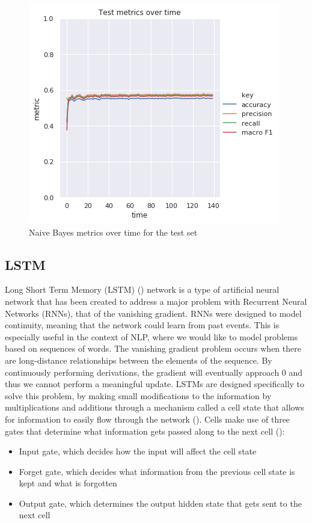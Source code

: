 \documentclass[12pt]{extreport}
\begin{document}
\begin{figure}[ht!]
\centering
\includegraphics[width=0.7\linewidth]{assets/framework/nb_BERT_test_metrics_holdout.png}
\caption{Naive Bayes metrics over time for the test set}
\label{fig:nb-metrics}
\end{figure}

\subsection{LSTM} \label{sec:lstm}

Long Short Term Memory (LSTM) (\cite{lstm}) network is a type of artificial neural network that has been created to address a major problem with Recurrent Neural Networks (RNNs), that of the vanishing gradient. RNNs were designed to model continuity, meaning that the network could learn from past events. This is especially useful in the context of NLP, where we would like to model problems based on sequences of words. The vanishing gradient problem occurs when there are long-distance relationships between the elements of the sequence. By continuously performing derivations, the gradient will eventually approach 0 and thus we cannot perform a meaningful update. LSTMs are designed specifically to solve this problem, by making small modifications to the information by multiplications and additions through a mechanism called a cell state that allows for information to easily flow through the network (\cite{lstmrnnfundamentals}). Cells make use of three gates that determine what information gets passed along to the next cell (\cite{colahlstm}):

\begin{itemize}
    \item Input gate, which decides how the input will affect the cell state
    \item Forget gate, which decides what information from the previous cell state is kept and what is forgotten
    \item Output gate, which determines the output hidden state that gets sent to the next cell
\end{itemize}
\end{document}
